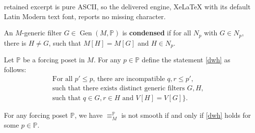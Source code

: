 \documentclass[10pt,a4paper]{amsart}
\newcommand{\Gen}{\operatorname{Gen}}
\newcommand{\markdef}[1]{\textbf{#1}}
\begin{document}
retained excerpt is pure ASCII, so the delivered engine, XeLaTeX with its default Latin Modern text font, reports no missing character.
\begin{definition}
\label{def : condensed filter}
An \(M\)-generic filter $G\in \Gen(M, \mathbb{P})$ is \markdef{condensed} if for all $N_p$ with $G\in N_p$, there is $H\neq G$, such that $M[H]=M[G]$ and $H\in N_p$. 
\end{definition}

\begin{definition} Let \(\mathbb{P}\) be a forcing poset in \(M\). For any \(p\in \mathbb{P}\) define the statement \eqref{dwh} as follows:
\begin{multline}\tag{$\dagger_p$}\label{dwh}
\text{For all $p'\leq p$, there are incompatible $q,r\leq p'$,}\\
\text{such that there exists distinct generic filters $G,H$,}\\
\text{such that $q\in G, r\in H$ and $V[H]=V[G]$\}.}
\end{multline}
\end{definition}

\begin{theorem}
\label{lemma : dagger}
For any forcing poset \(\mathbb{P}\), we have $\equiv_{M}^\mathbb{P}$ is not smooth if and only if \eqref{dwh} holds for some $p\in \mathbb{P}$.

\end{theorem}
\end{document}
